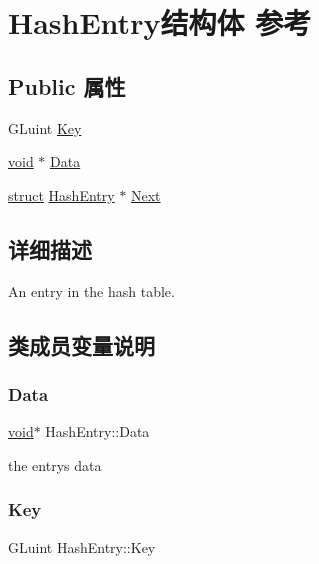 \hypertarget{struct_hash_entry}{}\section{Hash\+Entry结构体 参考}
\label{struct_hash_entry}
\subsection*{Public 属性}
\begin{DoxyCompactItemize}
\item 
G\+Luint \hyperlink{struct_hash_entry_a016be3700ce2cd17024417f0a77dda85}{Key}
\item 
\hyperlink{interfacevoid}{void} $\ast$ \hyperlink{struct_hash_entry_a6365661e86e5ed38c303116f9b46b34f}{Data}
\item 
\hyperlink{interfacestruct}{struct} \hyperlink{struct_hash_entry}{Hash\+Entry} $\ast$ \hyperlink{struct_hash_entry_a7f40955c541150c373e5320cebee2227}{Next}
\end{DoxyCompactItemize}


\subsection{详细描述}
An entry in the hash table. 

\subsection{类成员变量说明}
\mbox{\label{struct_hash_entry_a6365661e86e5ed38c303116f9b46b34f}} 
\subsubsection{\texorpdfstring{Data}{Data}}
{\footnotesize\ttfamily \hyperlink{interfacevoid}{void}$\ast$ Hash\+Entry\+::\+Data}

the entry\textquotesingle{}s data \mbox{\label{struct_hash_entry_a016be3700ce2cd17024417f0a77dda85}} 
\subsubsection{\texorpdfstring{Key}{Key}}
{\footnotesize\ttfamily G\+Luint Hash\+Entry\+::\+Key}

